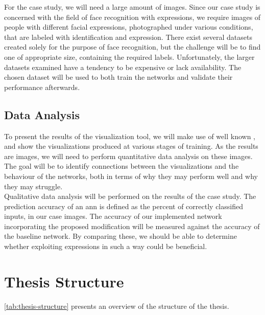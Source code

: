 \noindent For the case study, we will need a large amount of images. Since our case study is concerned with the field of face recognition with expressions, we require images of people with different facial expressions, photographed under various conditions, that are labeled with identification and expression. There exist several datasets created solely for the purpose of face recognition, but the challenge will be to find one of appropriate size, containing the required labels. Unfortunately, the larger datasets examined have a tendency to be expensive or lack availability. The chosen dataset will be used to both train the networks and validate their performance afterwards.

\subsection{Data Analysis}

To present the results of the visualization tool, we will make use of well known , and show the visualizations produced at various stages of training. As the results are images, we will need to perform quantitative data analysis on these images. The goal will be to identify connections between the visualizations and the behaviour of the networks, both in terms of why they may perform well and why they may struggle. \\

\noindent Qualitative data analysis will be performed on the results of the case study. The prediction accuracy of an \acrshort{ann} is defined as the percent of correctly classified inputs, in our case images. The accuracy of our implemented network incorporating the proposed modification will be measured against the accuracy of the baseline network. By comparing these, we should be able to determine whether exploiting expressions in such a way could be beneficial.

\section{Thesis Structure}

\autoref{tab:thesis-structure} presents an overview of the structure of the thesis.

